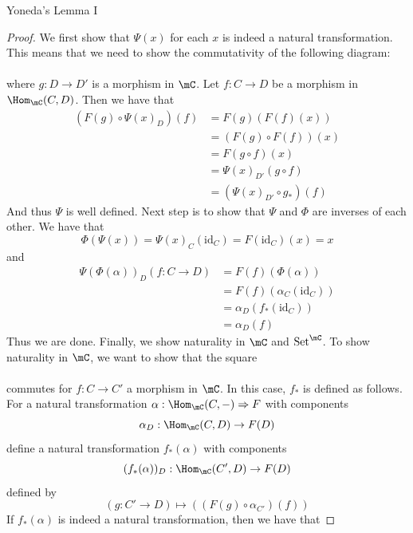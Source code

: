 \documentclass[a4paper]{article}
\begin{document}
\begin{thm}{Yoneda's Lemma I}{}
\begin{proof}
We first show that $\Psi(x)$ for each $x$ is indeed a natural transformation. This means that we need to show the commutativity of the following diagram: \\
\\
where $g:D\to D'$ is a morphism in $\mC$. Let $f:C\to D$ be a morphism in $\Hom_\mC(C,D)$. Then we have that 
\begin{align*}
(F(g)\circ\Psi(x)_D)(f)&=F(g)(F(f)(x))\\
&=(F(g)\circ F(f))(x)\\
&=F(g\circ f)(x)\\
&=\Psi(x)_{D'}(g\circ f)\\
&=(\Psi(x)_{D'}\circ g_\ast)(f)
\end{align*}
And thus $\Psi$ is well defined. Next step is to show that $\Psi$ and $\Phi$ are inverses of each other. We have that $$\Phi(\Psi(x))=\Psi(x)_C(\text{id}_C)=F(\text{id}_C)(x)=x$$ and 
\begin{align*}
\Psi(\Phi(\alpha))_D(f:C\to D)&=F(f)(\Phi(\alpha))\\
&=F(f)(\alpha_C(\text{id}_C))\\
&=\alpha_D(f_\ast(\text{id}_C))\\
&=\alpha_D(f)
\end{align*}
Thus we are done. Finally, we show naturality in $\mC$ and $\text{Set}^\mC$. To show naturality in $\mC$, we want to show that the square \\
\\
commutes for $f:C\to C'$ a morphism in $\mC$. In this case, $f_\ast$ is defined as follows. For a natural transformation $\alpha:\Hom_\mC(C,-)\Rightarrow F$ with components $$\alpha_D:\Hom_\mC(C,D)\to F(D)$$ define a natural transformation $f_\ast(\alpha)$ with components $$(f_\ast(\alpha))_D:\Hom_\mC(C',D)\to F(D)$$ defined by $$(g:C'\to D)\mapsto\left((F(g)\circ\alpha_{C'})(f)\right)$$ If $f_\ast(\alpha)$ is indeed a natural transformation, then we have that 

\end{proof}
\end{thm}
\end{document}
